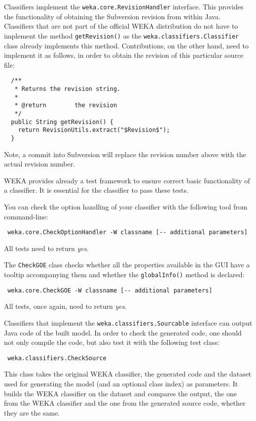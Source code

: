 \label{classifier_revisions}
Classifiers implement the \texttt{weka.core.RevisionHandler} interface. This
provides the functionality of obtaining the Subversion revision from within
Java. Classifiers that are not part of the official WEKA distribution
do not have to implement the method \texttt{getRevision()} as the
\texttt{weka.classifiers.Classifier} class already implements this method.
Contributions, on the other hand, need to implement it as follows, in order to
obtain the revision of this particular source file:
\begin{verbatim}
  /**
   * Returns the revision string.
   *
   * @return        the revision
   */
  public String getRevision() {
    return RevisionUtils.extract("$Revision$");
  }
\end{verbatim}
Note, a commit into Subversion will replace the revision number above with the
actual revision number.

WEKA provides already a test framework to ensure correct basic functionality of
a classifier. It is essential for the classifier to pass these tests.

You can check the option handling of your classifier with the following tool
from command-line:
\begin{verbatim}
 weka.core.CheckOptionHandler -W classname [-- additional parameters]
\end{verbatim}
All tests need to return \textit{yes}.

The \texttt{CheckGOE} class checks whether all the properties available in the
GUI have a tooltip accompanying them and whether the \texttt{globalInfo()}
method is declared:
\begin{verbatim}
 weka.core.CheckGOE -W classname [-- additional parameters]
\end{verbatim}
All tests, once again, need to return \textit{yes}.

Classifiers that implement the \texttt{weka.classifiers.Sourcable} interface can
output Java code of the built model. In order to check the generated  code, one
should not only compile the code, but also test it with the following test
class:
\begin{verbatim}
 weka.classifiers.CheckSource
\end{verbatim}
This class takes the original WEKA classifier, the generated code and the
dataset used for generating the model (and an optional class index) as
parameters. It builds the WEKA classifier on the dataset and compares the
output, the one from the WEKA classifier and the one from the generated source
code, whether they are the same.

